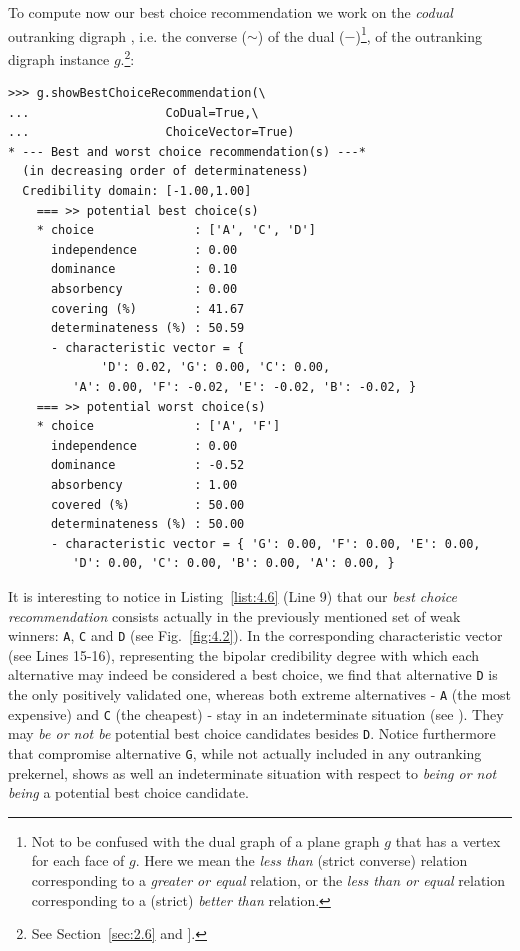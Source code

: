 To compute now our \Rubis best choice recommendation we work on the \emph{codual} outranking digraph , i.e. the converse ($\sim$) of the dual ($-$)\footnote{Not to be confused with the dual graph of a plane graph $g$ that has a vertex for each face of $g$. Here we mean the \emph{less than} (strict converse) relation corresponding to a \emph{greater or equal} relation, or the \emph{less than or equal} relation corresponding to a (strict) \emph{better than} relation.}, of the outranking digraph instance $g$.\footnote{See Section~\ref{sec:2.6} and \citet{BIS-2013}].}:
\begin{lstlisting}[caption={Computing the best choice recommendation},label=list:4.6]
>>> g.showBestChoiceRecommendation(\
...                   CoDual=True,\
...                   ChoiceVector=True)   
* --- Best and worst choice recommendation(s) ---*
  (in decreasing order of determinateness)   
  Credibility domain: [-1.00,1.00]
    === >> potential best choice(s)
    * choice              : ['A', 'C', 'D']
      independence        : 0.00
      dominance           : 0.10
      absorbency          : 0.00
      covering (%)        : 41.67
      determinateness (%) : 50.59
      - characteristic vector = {
             'D': 0.02, 'G': 0.00, 'C': 0.00,
	     'A': 0.00, 'F': -0.02, 'E': -0.02, 'B': -0.02, }
    === >> potential worst choice(s) 
    * choice              : ['A', 'F']
      independence        : 0.00
      dominance           : -0.52
      absorbency          : 1.00
      covered (%)         : 50.00
      determinateness (%) : 50.00
      - characteristic vector = { 'G': 0.00, 'F': 0.00, 'E': 0.00,
	     'D': 0.00, 'C': 0.00, 'B': 0.00, 'A': 0.00, }
\end{lstlisting}				  
It is interesting to notice in Listing~\ref{list:4.6} (Line 9) that our \emph{best choice recommendation} consists actually in the previously mentioned set of weak \Condorcet winners: \texttt{A}, \texttt{C} and \texttt{D} (see Fig.~\ref{fig:4.2}). In the corresponding characteristic vector (see Lines 15-16), representing the bipolar credibility degree with which each alternative may indeed be considered a best choice, we find that alternative \texttt{D} is the only positively validated one, whereas both extreme alternatives - \texttt{A} (the most expensive) and \texttt{C} (the cheapest) - stay in an indeterminate situation (see \citet{BIS-2006a,BIS-2006b}). They may \emph{be or not be} potential best choice candidates besides \texttt{D}. Notice furthermore that compromise alternative \texttt{G}, while not actually included in any outranking prekernel, shows as well an indeterminate situation with respect to \emph{being or not being} a potential best choice candidate.


